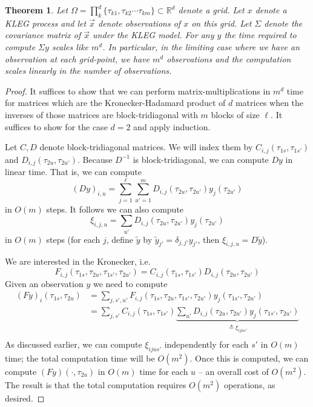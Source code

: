 \documentclass{article}
\newtheorem{theorem}{Theorem}
\theoremstyle{definition}
\begin{document}
\begin{theorem}
Let $\Omega = \prod_k^d \{\tau_{k1},\tau_{k2} \cdots \tau_{km} \} \subset \mathbb{R}^d$ denote a grid.  Let $x$ denote a KLEG process and let $\vec x$ denote observations of $x$ on this grid.  Let $\Sigma$ denote the covariance matrix of $\vec x$ under the KLEG model.  For any $y$ the time required to compute $\Sigma y$ scales like $m^d$.  In particular, in the limiting case where we have an observation at each grid-point, we have $m^d$ observations and the computation scales linearly in the number of observations.  
\end{theorem}
\begin{proof}
It suffices to show that we can perform matrix-multiplications in $m^d$ time for matrices which are the Kronecker-Hadamard product of $d$ matrices when the inverses of those matrices are block-tridiagonal with $m$ blocks of size $\ell$.  It suffices to show for the case $d=2$ and apply induction.  

Let $C,D$ denote block-tridiagonal matrices.  We will index them by $C_{i,j}(\tau_{1s},\tau_{1s'})$ and $D_{i,j}(\tau_{2u},\tau_{2u'})$.  Because $D^{-1}$ is block-tridiagonal, we can compute $Dy$ in linear time.  That is, we can compute 
\[
(Dy)_{i,u} = \sum_{j=1}^\ell \sum_{u'=1}^m D_{i,j}(\tau_{2u},\tau_{2u'}) y_j(\tau_{2u'})
\]
in $O(m)$ steps.  It follows we can also compute
\[
\xi_{i,j,u} = \sum_{u'} D_{i,j}(\tau_{2u},\tau_{2u'}) y_j(\tau_{2u'})
\]
in $O(m)$ steps (for each $j$, define $\tilde y$ by $\tilde y_{j'} = \delta_{j,j'} y_{j'}$, then  $\xi_{i,j,u} = D\tilde y$).

We are interested in the Kronecker, i.e.
\[
F_{i,j}(\tau_{1s},\tau_{2u},\tau_{1s'},\tau_{2u'}) = C_{i,j}(\tau_{1s},\tau_{1s'}) D_{i,j}(\tau_{2u},\tau_{2u'})
\]
Given an observation $y$ we need to compute
\begin{align*}
(Fy)_{i}(\tau_{1s},\tau_{2u}) 
  &= \sum_{j,s',u'} F_{i,j}(\tau_{1s},\tau_{2u},\tau_{1s'},\tau_{2u'}) y_j(\tau_{1s'},\tau_{2u'})\\
  &= \sum_{j,s'} C_{i,j}(\tau_{1s},\tau_{1s'}) \underbrace{\sum_{u'} D_{i,j}(\tau_{2u},\tau_{2u'}) y_j(\tau_{1s'},\tau_{2u'})}_{\triangleq \xi_{i j u s'}}\\
\end{align*}
As discussed earlier, we can compute $\xi_{ijus'}$ independently for each $s'$ in $O(m)$ time; the total computation time will be $O(m^2)$.  Once this is computed, we can compute $(Fy)(\cdot,\tau_{2u})$ in $O(m)$ time for each $u$ -- an overall cost of $O(m^2)$.  The result is that the total computation requires $O(m^2)$ operations, as desired.

\end{proof}
\end{document}

